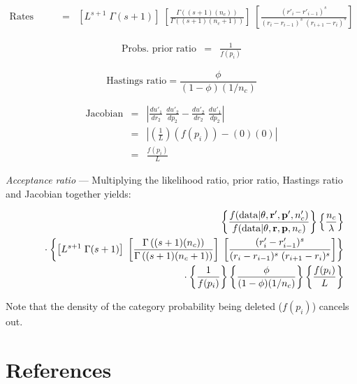 \documentclass[12pt]{article}
\newcommand{\ncat}{n_c}
\begin{document}
\begin{eqnarray*}
\mbox{Rates prior ratio} 
  & = & \left[ L^{s+1} \; \Gamma(s+1)\right] \; 
  \left[ \frac{\Gamma\left( (s+1) (\ncat) \right)}{\Gamma\left( (s+1) (\ncat + 1) \right)} \right] \;
  \left[ \frac{(r'_i - r'_{i-1})^s}{(r_i - r_{i-1})^s \; (r_{i+1} - r_i)^s} \right]
\end{eqnarray*}

\begin{eqnarray*}
\mbox{Probs. prior ratio} & = & \frac{1}{f(p_i)}
\end{eqnarray*}

\[ \mbox{Hastings ratio} = \frac{\phi}{(1-\phi)(1/\ncat)} \]

\begin{eqnarray*}
\mbox{Jacobian} & = & \left| \frac{d u'_1}{d r_2} \; \frac{d u'_2}{d p_2} - \frac{d u'_2}{d r_2} \; \frac{d u'_1}{d p_2} \right| \\
& = & \left| \left( \frac{1}{L} \right) \left( f(p_i) \right) - (0)(0) \right| \\
& = & \frac{f(p_i)}{L}
\end{eqnarray*}

{\em Acceptance ratio} --- Multiplying the likelihood ratio, prior ratio, Hastings ratio and Jacobian together yields:

\begin{eqnarray*}
& & \left\{ 
  \frac{f(\mbox{data} | {\bf \theta}, {\bf r}', {\bf p}', \ncat')}{f(\mbox{data} | {\bf \theta}, {\bf r}, {\bf p}, \ncat)} 
\right\}
\left\{ 
  \frac{\ncat}{\lambda} 
\right\} \\
& & \rule{.2in}{.0in} \cdot 
\left\{ 
  \left[ L^{s+1} \; \Gamma(s+1)\right] \; 
  \left[ \frac{\Gamma\left( (s+1) (\ncat) \right)}{\Gamma\left( (s+1) (\ncat + 1) \right)} \right] \;
  \left[ \frac{(r'_i - r'_{i-1})^s}{(r_i - r_{i-1})^s \; (r_{i+1} - r_i)^s} \right]
\right\} \\
& & \rule{.2in}{.0in} \cdot 
\left\{ 
 \frac{1}{f(p_i)}
\right\} 
\left\{ 
  \frac{\phi}{(1-\phi)(1/\ncat)} 
\right\}
\left\{ 
 \frac{f(p_i)}{L}
\right\}
\end{eqnarray*}

Note that the density of the category probability being deleted ($f(p_i)$) cancels out.

\section{References}
\renewcommand{\bibsection}{}

\end{document}
